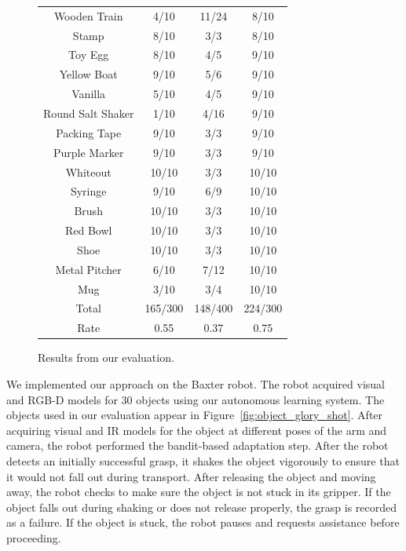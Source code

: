 \documentclass[conference,onecolumn]{IEEEtran}
\begin{document}
\begin{figure}
{\begin{tabular}{cccc}
Wooden Train        & 4/10          &  11/24       &  8/10 \\
Stamp    	    & 8/10          &  3/3         &  8/10 \\
Toy Egg    	    & 8/10          &  4/5         &  9/10 \\
Yellow Boat    	    & 9/10          &  5/6         &  9/10 \\
Vanilla	   	    & 5/10          &  4/5         &  9/10 \\
Round Salt Shaker   & 1/10          &  4/16        &  9/10 \\
Packing Tape        & 9/10          &  3/3         &  9/10 \\
Purple Marker       & 9/10          &  3/3         &  9/10 \\
Whiteout    	    & 10/10         &  3/3         &  10/10\\
Syringe    	    & 9/10          &  6/9         &  10/10\\
Brush    	    & 10/10         &  3/3         &  10/10\\
Red Bowl    	    & 10/10         &  3/3         &  10/10\\
Shoe    	    & 10/10         &  3/3         &  10/10\\
Metal Pitcher       & 6/10          &  7/12        &  10/10\\
Mug    		    & 3/10          &  3/4         &  10/10\\
\midrule
Total		    & 165/300       &  148/400     & 224/300\\
Rate		    & 0.55          &  0.37        & 0.75\\
\bottomrule
\end{tabular}
}
\caption{Results from our evaluation. \label{fig:evaluation}}
\end{figure}

We implemented our approach on the Baxter robot.  The robot acquired
visual and RGB-D models for 30 objects using our autonomous learning
system.  The objects used in our evaluation appear in
Figure~\ref{fig:object_glory_shot}.  After acquiring visual and IR
models for the object at different poses of the arm and camera, the
robot performed the bandit-based adaptation step.  After the robot
detects an initially successful grasp, it shakes the object vigorously
to ensure that it would not fall out during transport. After releasing
the object and moving away, the robot checks to make sure the object
is not stuck in its gripper. If the object falls out during shaking or
does not release properly, the grasp is recorded as a failure. If the
object is stuck, the robot pauses and requests assistance before
proceeding.
\end{document}

